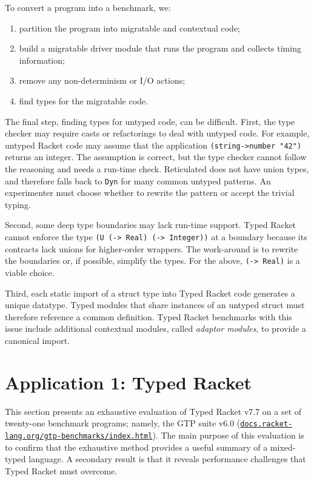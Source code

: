 \documentclass[ twoside,open=right,titlepage,numbers=noenddot,headinclude,%
                footinclude=true,cleardoublepage=empty,abstract=off,
                BCOR=5mm,paper=a4,fontsize=11pt,%
                ngerman,american,%
                parts,pdfspacing]{scrreprt}
\newcommand{\Scribtexttt}[1]{{\texttt{#1}}}
\newcommand{\Stttextmore}{{\fontencoding{T1}\selectfont>}}
\newlength{\stabLeft}
\newcommand{\atItemizeStart}[0]{\addtolength{\stabLeft}{\labelsep}
                                \addtolength{\stabLeft}{\labelwidth}}
\let\SOriginalthesubsubsection\thesubsubsection
\newcommand{\Ssubsection}[2]{\subsection[#1]{#2}\let\thesubsubsection\SOriginalthesubsubsection}
\newcommand{\Snolinkurl}[1]{\nolinkurl{#1}}
\renewcommand{\Ssubsection}[2]{\section[#1]{#2}}
\begin{document}
To convert a program into a benchmark, we:


\noindent \begin{enumerate}\atItemizeStart

\item partition the program into migratable and contextual code;

\item build a migratable driver module that runs the program and collects timing information;

\item remove any non{-}determinism or I/O actions;

\item find types for the migratable code.\end{enumerate}

The final step, finding types for untyped code, can be difficult.
First, the type checker may require casts or refactorings to deal with
 untyped code.
For example, untyped Racket code may assume that the
 application \Scribtexttt{(string{-}{\Stttextmore}number "42")} returns an integer.
The assumption is correct, but the type checker cannot follow the reasoning
 and needs a run{-}time check.
Reticulated does not have union types, and therefore falls back to \Scribtexttt{Dyn}
 for many common untyped patterns.
An experimenter must choose whether to rewrite the pattern or accept the
 trivial typing.

Second, some deep type boundaries may lack run{-}time support.
Typed Racket cannot enforce the type \Scribtexttt{(U ({-}{\Stttextmore} Real) ({-}{\Stttextmore} Integer))}
 at a boundary because its contracts lack unions for higher{-}order wrappers.
The work{-}around is to rewrite the boundaries or, if possible, simplify
 the types.
For the above, \Scribtexttt{({-}{\Stttextmore} Real)} is a viable choice.

Third, each static import of a struct type into Typed Racket code
 generates a unique datatype.
Typed modules that share instances of an untyped struct must therefore
 reference a common definition.
Typed Racket benchmarks with this issue include additional contextual
 modules, called \emph{adaptor modules}, to provide a canonical import.

\Ssubsection{Application 1: Typed Racket}{Application 1: Typed Racket}\label{t:x28part_x22secx3atrx3aevaluationx22x29}

This section presents an exhaustive evaluation of Typed Racket v7.7
 on a set of twenty{-}one benchmark programs;
 namely, the GTP suite v6.0 (\href{https://docs.racket-lang.org/gtp-benchmarks/index.html}{\Snolinkurl{docs.racket-lang.org/gtp-benchmarks/index.html}}).
The main purpose of this evaluation is to confirm that the
 exhaustive method provides a useful summary of a mixed{-}typed language.
A secondary result is that it reveals performance challenges
 that Typed Racket must overcome.
\end{document}
